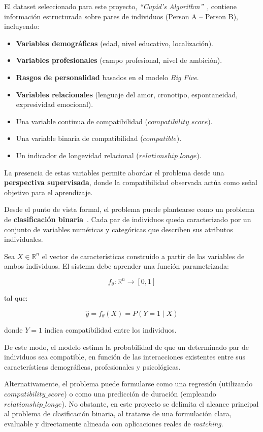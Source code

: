 El dataset seleccionado para este proyecto, \textit{“Cupid’s Algorithm”}~\cite{dataset_cupid}, contiene información estructurada sobre pares de individuos (Person A – Person B), incluyendo:

\begin{itemize}
    \item \textbf{Variables demográficas} (edad, nivel educativo, localización).
    \item \textbf{Variables profesionales} (campo profesional, nivel de ambición).
    \item \textbf{Rasgos de personalidad} basados en el modelo \textit{Big Five}.
    \item \textbf{Variables relacionales} (lenguaje del amor, cronotipo, espontaneidad, expresividad emocional).
    \item Una variable continua de compatibilidad ($compatibility\_score$).
    \item Una variable binaria de compatibilidad ($compatible$).
    \item Un indicador de longevidad relacional ($relationship\_longe$).
\end{itemize}

La presencia de estas variables permite abordar el problema desde una \textbf{perspectiva supervisada}, donde la compatibilidad observada actúa como señal objetivo para el aprendizaje.

Desde el punto de vista formal, el problema puede plantearse como un problema de 
\textbf{clasificación binaria}~\cite{geron2019hands}. Cada par de individuos queda 
caracterizado por un conjunto de variables numéricas y categóricas que describen 
sus atributos individuales.

Sea $X \in \mathbb{R}^n$ el vector de características construido a partir de las 
variables de ambos individuos. El sistema debe aprender una función parametrizada:

\[
f_\theta : \mathbb{R}^n \rightarrow [0,1]
\]

tal que:

\[
\hat{y} = f_\theta(X) = P(Y=1 \mid X)
\]

donde $Y=1$ indica compatibilidad entre los individuos.

De este modo, el modelo estima la probabilidad de que un determinado par 
de individuos sea compatible, en función de las interacciones existentes 
entre sus características demográficas, profesionales y psicológicas.

Alternativamente, el problema puede formularse como una regresión (utilizando $compatibility\_score$) o como una predicción de duración (empleando $relationship\_longe$). No obstante, en este proyecto se delimita el alcance principal al problema de clasificación binaria, al tratarse de una formulación clara, evaluable y directamente alineada con aplicaciones reales de \textit{matching}.\\

